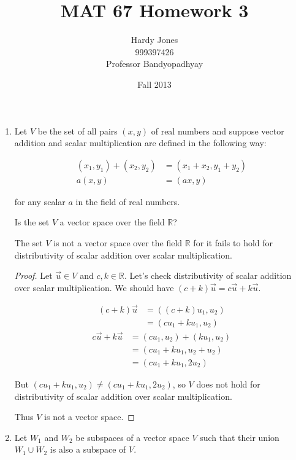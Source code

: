\documentclass[12pt,letterpaper]{article}
\title{MAT 67 Homework 3\vspace{-2ex}}
\author{Hardy Jones\\
        999397426\\
        Professor Bandyopadhyay\vspace{-2ex}}
\date{Fall 2013}
\begin{document}
  \maketitle

  \begin{enumerate}
    \item
      Let $V$ be the set of all pairs $(x,y)$ of real numbers and suppose vector addition and scalar multiplication are defined in the following way:

      \begin{align*}
        (x_1,y_1) + (x_2,y_2) &= (x_1 + x_2, y_1 + y_2) \\
        a(x,y) &= (ax,y)
      \end{align*}

      for any scalar $a$ in the field of real numbers.

      Is the set $V$ a vector space over the field $\mathbb{R}$?

      The set $V$ is not a vector space over the field $\mathbb{R}$ for it fails to hold for distributivity of scalar addition over scalar multiplication.

      \begin{proof}

        Let $\vec{u} \in V$ and $ c, k \in \mathbb{R}$.  Let's check distributivity of scalar addition over scalar multiplication.  We should have $(c + k)\vec{u} = c\vec{u} + k\vec{u}$.

        \begin{align*}
          (c + k)\vec{u} &= ((c + k)u_1, u_2) \\
          &= (cu_1 + ku_1, u_2)
        \end{align*}
        \begin{align*}
          c\vec{u} + k\vec{u} &= (cu_1, u_2) + (ku_1, u_2) \\
          &= (cu_1 + ku_1, u_2 + u_2) \\
          &= (cu_1 + ku_1, 2u_2)
        \end{align*}

        But $(cu_1 + ku_1, u_2) \neq (cu_1 + ku_1, 2u_2)$,
        so $V$ does not hold for distributivity of scalar addition over scalar multiplication.

        Thus $V$ is not a vector space.
      \end{proof}

    \pagebreak

    \item
      Let $W_1$ and $W_2$ be subspaces of a vector space $V$ such that their union $W_1 \cup W_2$ is also a subspace of $V$.


\end{enumerate}
\end{document}
